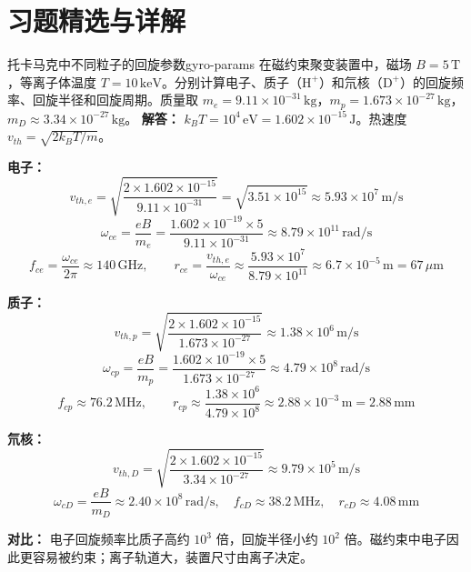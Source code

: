 
\section*{习题精选与详解}
{}

\begin{example}{托卡马克中不同粒子的回旋参数}{gyro-params}
在磁约束聚变装置中，磁场 $B=5\,\mathrm{T}$，等离子体温度 $T=10\,\mathrm{keV}$。分别计算电子、质子（$\mathrm{H}^+$）和氘核（$\mathrm{D}^+$）的回旋频率、回旋半径和回旋周期。质量取 $m_e=9.11\times 10^{-31}\,\mathrm{kg}$，$m_p=1.673\times 10^{-27}\,\mathrm{kg}$，$m_D\approx 3.34\times 10^{-27}\,\mathrm{kg}$。
\tcblower
\textbf{解答：}
$k_{\!B}T = 10^4\,\mathrm{eV} = 1.602\times 10^{-15}\,\mathrm{J}$。热速度 $v_{th}=\sqrt{2k_{\!B}T/m}$。

\textbf{电子：}
\[
v_{th,e} = \sqrt{\frac{2\times 1.602\times 10^{-15}}{9.11\times 10^{-31}}} = \sqrt{3.51\times 10^{15}} \approx 5.93\times 10^{7}\,\mathrm{m/s}
\]
\[
\omega_{ce} = \frac{eB}{m_e} = \frac{1.602\times 10^{-19}\times 5}{9.11\times 10^{-31}} \approx 8.79\times 10^{11}\,\mathrm{rad/s}
\]
\[
f_{ce} = \frac{\omega_{ce}}{2\pi} \approx 140\,\mathrm{GHz},\qquad r_{ce} = \frac{v_{th,e}}{\omega_{ce}} \approx \frac{5.93\times 10^{7}}{8.79\times 10^{11}} \approx 6.7\times 10^{-5}\,\mathrm{m} = 67\,\mu\mathrm{m}
\]

\textbf{质子：}
\[
v_{th,p} = \sqrt{\frac{2\times 1.602\times 10^{-15}}{1.673\times 10^{-27}}} \approx 1.38\times 10^{6}\,\mathrm{m/s}
\]
\[
\omega_{cp} = \frac{eB}{m_p} = \frac{1.602\times 10^{-19}\times 5}{1.673\times 10^{-27}} \approx 4.79\times 10^{8}\,\mathrm{rad/s}
\]
\[
f_{cp} \approx 76.2\,\mathrm{MHz},\qquad r_{cp} \approx \frac{1.38\times 10^{6}}{4.79\times 10^{8}} \approx 2.88\times 10^{-3}\,\mathrm{m} = 2.88\,\mathrm{mm}
\]

\textbf{氘核：}
\[
v_{th,D} = \sqrt{\frac{2\times 1.602\times 10^{-15}}{3.34\times 10^{-27}}} \approx 9.79\times 10^{5}\,\mathrm{m/s}
\]
\[
\omega_{cD} = \frac{eB}{m_D} \approx 2.40\times 10^{8}\,\mathrm{rad/s},\quad f_{cD}\approx 38.2\,\mathrm{MHz},\quad r_{cD}\approx 4.08\,\mathrm{mm}
\]

\textbf{对比：} 电子回旋频率比质子高约 $10^3$ 倍，回旋半径小约 $10^2$ 倍。磁约束中电子因此更容易被约束；离子轨道大，装置尺寸由离子决定。
\end{example}

